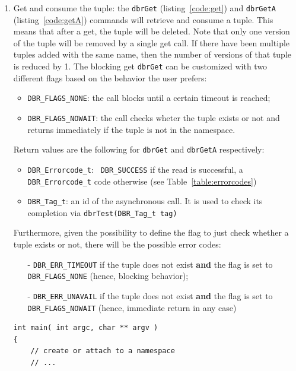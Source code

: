 \begin{enumerate}
\item Get and consume the tuple: the \texttt{dbrGet} (listing~\ref{code:get}) and \texttt{dbrGetA} (listing~\ref{code:getA}) commands will retrieve and consume a tuple. This means that after a
  get, the tuple will be deleted. Note that only one version of the
  tuple will be removed by a single get call. If there have been
  multiple tuples added with the same name, then the number of
  versions of that tuple is reduced by 1.
The blocking get \texttt{dbrGet} can be customized with two different flags based on the behavior the user prefers:
\begin{itemize}
	\item \texttt{DBR\_FLAGS\_NONE}: the call blocks until a certain timeout is reached;
	\item \texttt{DBR\_FLAGS\_NOWAIT}: the call checks wheter the tuple exists or not and returns immediately if the tuple is not in the namespace.
\end{itemize}

Return values are the following  for \texttt{dbrGet} and \texttt{dbrGetA} respectively:
\begin{itemize}
	\item \texttt{DBR\_Errorcode\_t}: \texttt{ DBR\_SUCCESS} if the read is successful, a \texttt{DBR\_Errorcode\_t} code otherwise (see Table~\ref{table:errorcodes}) 
	\item \texttt{DBR\_Tag\_t}: an id of the asynchronous call. It is used to check its completion via \texttt{dbrTest(DBR\_Tag\_t tag)}
\end{itemize}

Furthermore, given the possibility to define the flag to just check whether a tuple exists or not, there will be the possible error codes:
\begin{itemize}
	\item[-] \texttt{DBR\_ERR\_TIMEOUT} if the tuple does not exist \textbf{and} the flag is set to \texttt{DBR\_FLAGS\_NONE} (hence, blocking behavior);
	\item [-] \texttt{DBR\_ERR\_UNAVAIL} if the tuple does not exist \textbf{and} the flag is set to \texttt{DBR\_FLAGS\_NOWAIT} (hence, immediate return in any case)
\end{itemize}


\begin{lstlisting}[style=mystyle,basicstyle=\scriptsize\ttfamily,caption=Get data from the namespace (blocking), label=code:get]
int main( int argc, char ** argv )
{
	// create or attach to a namespace
	// ...


\end{lstlisting}
\end{enumerate}
